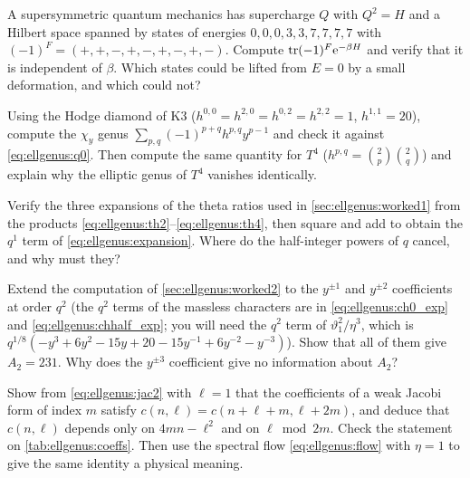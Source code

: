 \begin{exercise}[$\star$]
A supersymmetric quantum mechanics has supercharge $Q$ with $Q^2=H$ and a Hilbert space
spanned by states of energies $0,0,0,3,3,7,7,7,7$ with $(-1)^F=(+,+,-,+,-,+,-,+,-)$. Compute
$\operatorname{tr}(-1)^F\mathrm{e}^{-\beta H}$ and verify that it is independent of $\beta$. Which states could be
lifted from $E=0$ by a small deformation, and which could not?
\end{exercise}

\begin{exercise}[$\star$]
Using the Hodge diamond of K3 ($h^{0,0}=h^{2,0}=h^{0,2}=h^{2,2}=1$, $h^{1,1}=20$), compute
the $\chi_y$ genus $\sum_{p,q}(-1)^{p+q}h^{p,q}y^{p-1}$ and check it against
\eqref{eq:ellgenus:q0}. Then compute the same quantity for $T^4$ ($h^{p,q}=\binom2p\binom2q$)
and explain why the elliptic genus of $T^4$ vanishes identically.
\end{exercise}

\begin{exercise}[$\star\star$]
Verify the three expansions of the theta ratios used in \cref{sec:ellgenus:worked1} from the
products \eqref{eq:ellgenus:th2}--\eqref{eq:ellgenus:th4}, then square and add to obtain the
$q^1$ term of \eqref{eq:ellgenus:expansion}. Where do the half-integer powers of $q$ cancel,
and why must they?
\end{exercise}

\begin{exercise}[$\star\star$]\label{exe:ellgenus:A2}
Extend the computation of \cref{sec:ellgenus:worked2} to the $y^{\pm1}$ and $y^{\pm2}$
coefficients at order $q^2$ (the $q^2$ terms of the massless characters are in
\eqref{eq:ellgenus:ch0_exp} and \eqref{eq:ellgenus:chhalf_exp}; you will need the $q^2$ term
of $\vartheta_1^2/\eta^3$, which is $q^{1/8}(-y^3+6y^2-15y+20-15y^{-1}+6y^{-2}-y^{-3})$).
Show that all of them give $A_2=231$. Why does the $y^{\pm3}$ coefficient give no
information about $A_2$?
\end{exercise}

\begin{exercise}[$\star\star$]
Show from \eqref{eq:ellgenus:jac2} with $\ell=1$ that the coefficients of a weak Jacobi
form of index $m$ satisfy $c(n,\ell)=c(n+\ell+m,\ell+2m)$, and deduce that $c(n,\ell)$
depends only on $4mn-\ell^2$ and on $\ell\bmod2m$. Check the statement on
\cref{tab:ellgenus:coeffs}. Then use the spectral flow \eqref{eq:ellgenus:flow} with
$\eta=1$ to give the same identity a physical meaning.
\end{exercise}

